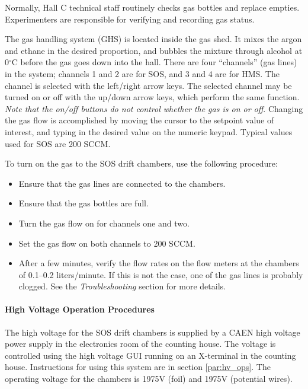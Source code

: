 \begin{obsolete}
Normally, Hall C technical staff routinely checks gas bottles and
replace empties.  Experimenters are responsible for verifying and
recording gas status.  

The gas handling system (GHS) is located inside the gas shed.  It
mixes the argon and ethane in the desired proportion, and bubbles the
mixture through alcohol at 0$^\circ$C before the gas goes down into
the hall.  There are four ``channels'' (gas lines) in the system;
channels 1 and 2 are for SOS, and 3 and 4 are for HMS.  The channel is
selected with the left/right arrow keys.  The selected channel may be
turned on or off with the up/down arrow keys, which perform the same
function.  {\em Note that the on/off buttons do not control whether
the gas is on or off}.  Changing the gas flow is accomplished by
moving the cursor to the setpoint value of interest, and typing in the
desired value on the numeric keypad.  Typical values used for SOS are
200 SCCM.

To turn on the gas to the SOS drift chambers, use the following
procedure:

\begin{itemize}
\item{Ensure that the gas lines are connected to the chambers.}
\item{Ensure that the gas bottles are full.}
\item{Turn the gas flow on for channels one and two.}
\item{Set the gas flow on both channels to 200 SCCM.}
\item{After a few minutes, verify the flow rates on the flow meters at
      the chambers of 0.1--0.2 liters/minute.  If this is not the
      case, one of the gas lines is probably clogged.  See the {\em
      Troubleshooting} section for more details.}
\end{itemize}


\paragraph{High Voltage Operation Procedures}

The high voltage for the SOS drift chambers is supplied by a CAEN
high voltage power supply in the electronics room of the counting
house.  The voltage is controlled using the
high voltage GUI running on an  X-terminal in the counting house.
Instructions for using this system are in section \ref{par:hv_ops}.
The operating
voltage for the chambers is 1975V (foil) and 1975V (potential
wires).


\end{obsolete}
